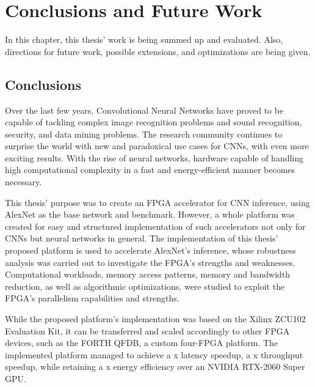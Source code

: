 \chapter{Conclusions and Future Work}
\label{Chapter-Conclusions-and-Future-Work}
In this chapter, this thesis' work is being summed up and evaluated. Also, directions for future work, possible extensions, and optimizations are being given.

\section{Conclusions}
Over the last few years, Convolutional Neural Networks have proved to be capable of tackling complex image recognition problems and sound recognition, security, and data mining problems. The research community continues to surprise the world with new and paradoxical use cases for CNNs, with even more exciting results. With the rise of neural networks, hardware capable of handling high computational complexity in a fast and energy-efficient manner becomes necessary.

This thesis' purpose was to create an FPGA accelerator for CNN inference, using AlexNet as the base network and benchmark. However, a whole platform was created for easy and structured implementation of such accelerators not only for CNNs but neural networks in general. The implementation of this thesis' proposed platform is used to accelerate AlexNet's inference, whose robustness analysis was carried out to investigate the FPGA's strengths and weaknesses. Computational workloads, memory access patterns, memory and bandwidth reduction, as well as algorithmic optimizations, were studied to exploit the FPGA's parallelism capabilities and strengths.

While the proposed platform's implementation was based on the Xilinx ZCU102 Evaluation Kit, it can be transferred and scaled accordingly to other FPGA devices, such as the FORTH QFDB, a custom four-FPGA platform. The implemented platform managed to achieve a x latency speedup, a x throughput speedup, while retaining a x energy efficiency over an NVIDIA RTX-2060 Super GPU.

